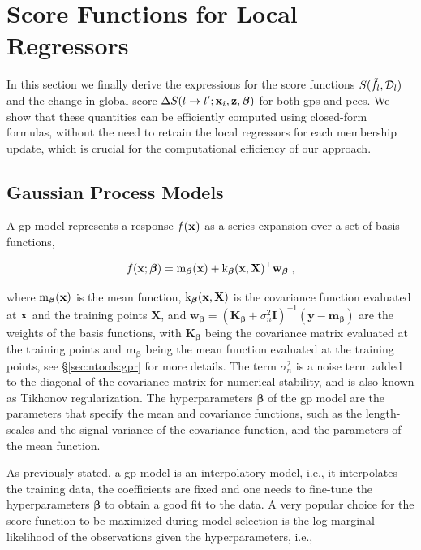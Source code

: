 \section{Score Functions for Local Regressors}
\label{sc:score_functions}

In this section we finally derive the expressions for the score functions $S(\tilde{f}_l, \mathcal{D}_l)$ and the change in global score $\Delta S (l \rightarrow l^{\prime}; \mathbf{x}_i, \mathbf{z}, \boldsymbol{\beta})$ for both \glspl{gp} and \glspl{pce}. We show that these quantities can be efficiently computed using closed-form formulas, without the need to retrain the local regressors for each membership update, which is crucial for the computational efficiency of our approach.

\subsection{Gaussian Process Models}
\label{sc:gp_models}

A \gls{gp} model represents a response $f(\mathbf{x})$ as a series expansion over a set of basis functions,

\begin{equation}
  \tilde{f}(\mathbf{x}; \boldsymbol{\beta}) = \mathrm{m}_{\boldsymbol{\beta}}(\mathbf{x}) + \mathrm{k}_{\boldsymbol{\beta}}(\mathbf{x}, \mathbf{X})^{\top} \mathbf{w}_{\boldsymbol{\beta}} \;,
\end{equation}

where $\mathrm{m}_{\boldsymbol{\beta}}(\mathbf{x})$ is the mean function, $\mathrm{k}_{\boldsymbol{\beta}}(\mathbf{x}, \mathbf{X})$ is the covariance function evaluated at $\mathbf{x}$ and the training points $\mathbf{X}$, and $\mathbf{w}_{\boldsymbol{\beta}} = (\mathbf{K}_{\boldsymbol{\beta}} + \sigma_n^2 \mathbf{I})^{-1} (\mathbf{y} - \mathbf{m}_{\boldsymbol{\beta}})$ are the weights of the basis functions, with $\mathbf{K}_{\boldsymbol{\beta}}$ being the covariance matrix evaluated at the training points and $\mathbf{m}_{\boldsymbol{\beta}}$ being the mean function evaluated at the training points, see \S\ref{sec:ntools:gpr} for more details. The term $\sigma_n^2$ is a noise term added to the diagonal of the covariance matrix for numerical stability, and is also known as Tikhonov regularization. The hyperparameters $\boldsymbol{\beta}$ of the \gls{gp} model are the parameters that specify the mean and covariance functions, such as the length-scales and the signal variance of the covariance function, and the parameters of the mean function.

\smallskip
As previously stated, a \gls{gp} model is an interpolatory model, i.e., it interpolates the training data, the coefficients are fixed and one needs to fine-tune the hyperparameters $\boldsymbol{\beta}$ to obtain a good fit to the data. A very popular choice for the score function to be maximized during model selection is the log-marginal likelihood of the observations given the hyperparameters, i.e.,

